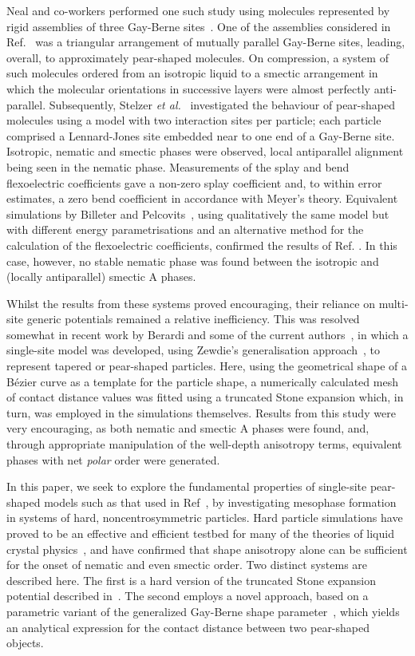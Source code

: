 \documentclass[%
reprint,
superscriptaddress,
showpacs,
 amsmath,amssymb,
 aps,
floatfix,
]{revtex4-1}
\begin{document}
Neal and co-workers performed one such study using molecules represented by rigid assemblies of
three Gay-Berne sites~\cite{Neal}. One of the assemblies considered in Ref.~\cite{Neal} was a
triangular arrangement of mutually parallel Gay-Berne sites, leading, overall, to approximately
pear-shaped molecules. On compression, a system of such molecules ordered from an isotropic
liquid to a smectic arrangement in which the molecular orientations in successive layers were
almost perfectly anti-parallel. Subsequently, Stelzer {\em et al.}~\cite{Stelzer_Berardi_99}
investigated the behaviour of pear-shaped molecules using a model with two interaction sites per
particle; each particle comprised a Lennard-Jones site embedded near to one end of a Gay-Berne
site. Isotropic, nematic and smectic phases were observed, local antiparallel alignment being
seen in the nematic phase. Measurements of the splay and bend flexoelectric coefficients gave a
non-zero splay coefficient and, to within error estimates, a zero bend coefficient in accordance
with Meyer's theory. Equivalent simulations by Billeter and
Pelcovits~\cite{Billeter_Pelcovits_00}, using qualitatively the same model but with different
energy parametrisations and an alternative method for the calculation of the flexoelectric
coefficients, confirmed the results of Ref. \cite{Stelzer_Berardi_99}. In this case, however, no
stable nematic phase was found between the isotropic and (locally antiparallel) smectic A
phases.

Whilst the results from these systems proved encouraging, their reliance on multi-site generic
potentials remained a relative inefficiency. This was resolved somewhat in recent work by
Berardi and some of the current authors~\cite{Berardi_Ricci_01}, in which a single-site model
was developed, using Zewdie's generalisation approach~\cite{Zewdie98a,Zewdie98b}, to represent
tapered or pear-shaped particles. Here, using the geometrical shape of a B\'{e}zier curve as a
template for the particle shape, a numerically calculated mesh of contact distance values was
fitted using a truncated Stone expansion which, in turn, was employed in the simulations themselves.
Results from this study were very encouraging, as both nematic and smectic A phases were
found, and, through appropriate manipulation of the well-depth anisotropy terms, equivalent
phases with net {\em polar} order were generated.

In this paper, we seek to explore the fundamental properties of single-site pear-shaped models
such as that used in Ref~\cite{Berardi_Ricci_01}, by investigating mesophase formation
in systems of hard, noncentrosymmetric particles. Hard particle simulations have proved to be an
effective and efficient testbed for many of the theories of liquid crystal
physics~\cite{hard_rev}, and have confirmed that shape anisotropy alone can be sufficient for
the onset of nematic and even smectic order. Two distinct systems are described here. The first
is a hard version of the truncated Stone expansion potential described in~\cite{Berardi_Ricci_01}. The
second employs a novel approach, based on a parametric variant of the generalized Gay-Berne
shape parameter~\cite{CleaverCare96}, which yields an analytical expression for the contact
distance between two pear-shaped objects.
\end{document}
